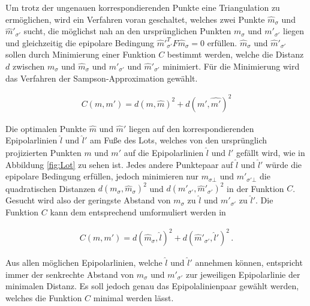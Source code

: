 Um trotz der ungenauen korrespondierenden Punkte eine Triangulation zu ermöglichen, wird ein Verfahren voran geschaltet, welches zwei Punkte $\hat{m}_\sigma$ und $\hat{m}'_{\sigma'}$ sucht, die möglichst nah an den ursprünglichen Punkten $m_\sigma$ und $m'_{\sigma'}$ liegen und gleichzeitig die epipolare Bedingung $\hat{m}'^T_{\sigma'}F\hat{m}_\sigma = 0$ erfüllen. $\hat{m}_\sigma$ und $\hat{m}'_{\sigma'}$ sollen durch Minimierung einer Funktion $C$ bestimmt werden, welche die Distanz  $d$ zwischen $m_\sigma$ und $\hat{m}_\sigma$ und $m'_{\sigma'}$ und $\hat{m}'_{\sigma'}$ minimiert. Für die Minimierung wird das Verfahren der Sampson-Approximation gewählt\cite{HZ}. 


\begin{gather}
	C(m,m') = d(m,\hat{m})^2 + d(m',\hat{m'})^2
\end{gather}


Die optimalen Punkte $\hat{m}$ und $\hat{m}'$ liegen auf den korrespondierenden Epipolarlinien $\hat{l}$ und $\hat{l}'$ am Fuße des Lots, welches von den ursprünglich projizierten Punkten $m$ und $m'$ auf die Epipolarlinien $\hat{l}$ und $\hat{l'}$ gefällt wird\cite{HZ}, wie in Abbildung \ref{fig:Lot} zu sehen ist. Jedes andere Punktepaar auf $\hat{l}$ und $\hat{l}'$ würde die epipolare Bedingung erfüllen, jedoch minimieren nur $m_{\sigma\bot}$ und $m'_{\sigma' \bot}$ die quadratischen Distanzen $d(m_\sigma,\hat{m}_\sigma)^2$ und $ d(m'_{\sigma'},\hat{m}'_{\sigma'})^2$ in der Funktion $C$. Gesucht wird also der geringste Abstand von $m_\sigma$ zu $\hat{l}$ und $m'_{\sigma'}$ zu $\hat{l}'$. Die Funktion $C$ kann dem entsprechend umformuliert werden in 

\begin{gather}
	C(m,m') = d(\hat{m}_\sigma,\hat{l})^2 + d(\hat{m}'_{\sigma'},\hat{l}')^2 \, .
\end{gather}


Aus allen möglichen Epipolarlinien, welche $\hat{l}$ und $\hat{l}'$ annehmen können, entspricht immer der senkrechte Abstand von $m_\sigma$ und $m'_{\sigma'}$ zur jeweiligen Epipolarlinie der minimalen Distanz. Es soll jedoch genau das Epipolalinienpaar gewählt werden, welches die Funktion $C$ minimal werden lässt\cite{HZ}.\\



